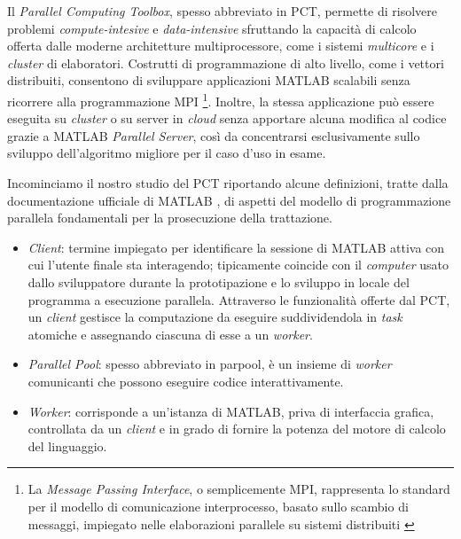 \nocite{MathWorksParallelComputing}
Il \textit{Parallel Computing Toolbox}, spesso abbreviato in PCT, permette di risolvere problemi \textit{compute-intesive} e  \textit{data-intensive} sfruttando 
la capacit\`a di calcolo offerta dalle moderne architetture multiprocessore, come i sistemi \textit{multicore} e i \textit{cluster} di elaboratori. \newline
Costrutti di programmazione di alto livello, come i vettori distribuiti, consentono di sviluppare applicazioni MATLAB scalabili senza ricorrere alla programmazione 
MPI \footnote{La \textit{Message Passing Interface}, o semplicemente MPI, rappresenta lo standard per il modello di comunicazione interprocesso, basato sullo scambio 
di messaggi, impiegato nelle elaborazioni parallele su sistemi distribuiti \cite{NMSUMPIIntro}}.\newline
Inoltre, la stessa applicazione pu\`o essere eseguita su \textit{cluster} o su server in \textit{cloud} senza apportare alcuna modifica al codice grazie a MATLAB 
\textit{Parallel Server}, cos\`i da concentrarsi esclusivamente sullo sviluppo dell'algoritmo migliore per il caso d'uso in esame.

Incominciamo il nostro studio del PCT riportando alcune definizioni, tratte dalla documentazione ufficiale di MATLAB \cite{MathWorksWhatIsParallel}, di aspetti del modello di programmazione parallela fondamentali per la prosecuzione della trattazione.
\begin{itemize}
\item \textit{Client}: termine impiegato per identificare la sessione di MATLAB attiva con cui l'utente finale sta interagendo; tipicamente coincide con il 
\textit{computer} usato dallo sviluppatore durante la prototipazione e lo sviluppo in locale del programma a esecuzione parallela.\newline
Attraverso le funzionalit\`a offerte dal PCT, un \textit{client} gestisce la computazione da eseguire suddividendola in  \textit{task} atomiche e assegnando ciascuna 
di esse a un \textit{worker}.
\item \textit{Parallel Pool}: spesso abbreviato in parpool, \`e un insieme di \textit{worker} comunicanti che possono eseguire codice interattivamente.
\item \textit{Worker}: corrisponde a un'istanza di MATLAB, priva di interfaccia grafica, controllata da un \textit{client} e in grado di fornire la potenza del 
motore di calcolo del linguaggio.
\end{itemize}

